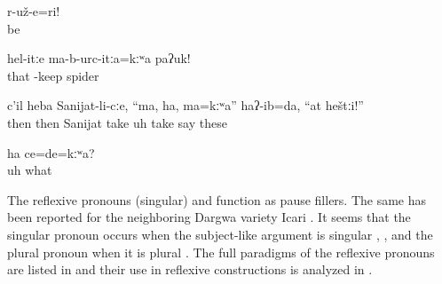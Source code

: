 \begin{exe}
	\ex	\label{ex:‎‎‎Calm down minor}
	\gll	r-už-e=ri!\\
		be\\
	\glt	{}

	\ex	\label{ex:‎‎‎Do not keep the spider like this minor}
	\gll	hel-itːe	ma-b-urc-itːa=kːʷa	paʔuk!\\
		that	-keep	spider\\
	\glt	{}

	\ex	\label{ex:Then I said to Sanijat, hey, take, these are for you minor}
	\gll	c'il	heba	Sanijat-li-cːe,	``ma,	ha,	ma=kːʷa''	haʔ-ib=da,	``at	heštːi!''\\
		then	then	Sanijat	take	uh	take	say		these\\
	\glt	{}

	\ex	\label{ex:‎Uh, what was it (that I wanted to say) minor}
	\gll	ha	ce=de=kːʷa?\\
		uh	what\\
	\glt	{}
\end{exe}

The  reflexive pronouns  (singular) and  function as pause fillers. The same has been reported for the neighboring Dargwa variety Icari \citep[187, fn.~107]{Sumbatova.Mutalov2003}. It seems that the singular pronoun occurs when the subject-like argument is singular , , and the plural pronoun when it is plural . The full paradigms of the reflexive pronouns are listed in  and their use in reflexive constructions is analyzed in .

